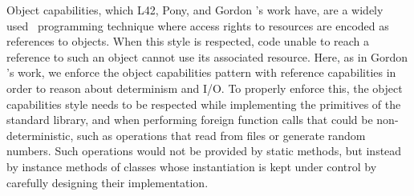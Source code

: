 



\label{s:OCs}
Object capabilities, which L42, Pony, and Gordon \etal's work have, are a widely used~\cite{miller2003capability,noble2016abstract,karger1988improving,RobustComposition} programming technique where access rights to resources are encoded as references to objects. When this style
is respected, 
code 
unable to reach a reference
 to such an object cannot use its associated resource.
Here, as in Gordon \etal's work, we enforce the object capabilities pattern with reference capabilities in order to reason about determinism and I/O. To properly enforce this, the object capabilities style needs to be respected while implementing the primitives of the standard library, and when performing foreign function calls that could be non-deterministic, such as operations that read from files or generate random numbers. Such operations would not be provided by static methods, but instead by instance methods of classes whose instantiation is kept under control
by carefully designing their implementation. 




